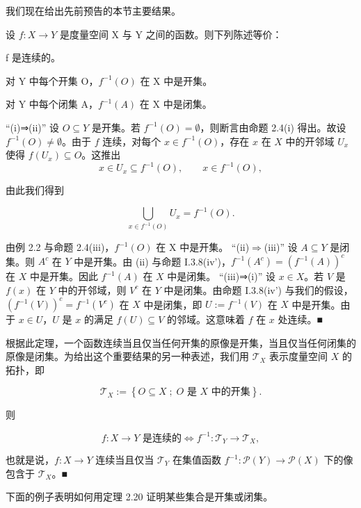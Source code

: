 我们现在给出先前预告的本节主要结果。

\begin{theorem}

设 $ f: X \to Y $ 是度量空间 X 与 Y 之间的函数。则下列陈述等价：

\begin{subitems}
\item

f 是连续的。

\item

对 Y 中每个开集 O，$ f^{-1}(O) $ 在 X 中是开集。

\item

对 Y 中每个闭集 A，$ f^{-1}(A) $ 在 X 中是闭集。

\proofhead
“(i)⇒(ii)” 设 $O \subseteq Y$ 是开集。若 $f^{-1}(O) = \emptyset$，则断言由命题 2.4(i) 得出。故设 $f^{-1}(O) \neq \emptyset$。由于 $f$ 连续，对每个 $x \in f^{-1}(O)$，存在 $x$ 在 $X$ 中的开邻域 $U_x$ 使得 $f(U_x) \subseteq O$。这推出
\[
x\in U_{x}\subseteq f^{-1}(O),\qquad x\in f^{-1}(O),
\]

由此我们得到

\[
\bigcup_{x\in f^{-1}(O)}U_{x}=f^{-1}(O).
\]

由例 2.2 与命题 2.4(iii)，$ f^{-1}(O) $ 在 X 中是开集。
“(ii)$\Rightarrow$(iii)” 设 $ A \subseteq Y $ 是闭集。则 $ A^c $ 在 $ Y $ 中是开集。由 (ii) 与命题 I.3.8(iv')，$ f^{-1}(A^c) = (f^{-1}(A))^c $ 在 $ X $ 中是开集。因此 $ f^{-1}(A) $ 在 $ X $ 中是闭集。
“(iii)⇒(i)” 设 $ x \in X $。若 $ V $ 是 $ f(x) $ 在 $ Y $ 中的开邻域，则 $ V^c $ 在 $ Y $ 中是闭集。由命题 I.3.8(iv’) 与我们的假设，$ (f^{-1}(V))^c = f^{-1}(V^c) $ 在 $ X $ 中是闭集，即 $ U := f^{-1}(V) $ 在 $ X $ 中是开集。由于 $ x \in U $，$ U $ 是 $ x $ 的满足 $ f(U) \subseteq V $ 的邻域。这意味着 $ f $ 在 $ x $ 处连续。■

\end{subitems}

\end{theorem}

\begin{remark}

根据此定理，一个函数连续当且仅当任何开集的原像是开集，当且仅当任何闭集的原像是闭集。为给出这个重要结果的另一种表述，我们用 $\mathcal{T}_{X}$ 表示度量空间 $X$ 的拓扑，即

\[
\mathcal{T}_{X}:=\left\{O\subseteq X\;;\;O\text{ 是 }X\text{ 中的开集}\right\}.
\]

则

\[
f\colon X\to Y\text{ 是连续的}\Longleftrightarrow f^{-1}\colon\mathcal{T}_{Y}\to\mathcal{T}_{X},
\]

也就是说，$ f: X \to Y $ 连续当且仅当 $ \mathcal{T}_Y $ 在集值函数 $ f^{-1}: \mathcal{P}(Y) \to \mathcal{P}(X) $ 下的像包含于 $ \mathcal{T}_X $。■

下面的例子表明如何用定理 2.20 证明某些集合是开集或闭集。

\end{remark}

